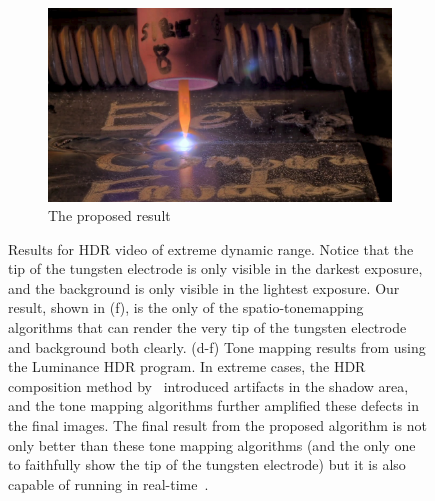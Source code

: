 \begin{figure}
\begin{subfigure}[b]{6.2in}
\centering
  \includegraphics[width=6.0in]{ch2/diagrams/frames/5stops/final_tm_result.jpg}
  \caption{The proposed result~\cite{lo2012high}}
  \label{fig:mouse}
\end{subfigure}
\caption{Results for HDR video of extreme dynamic range.
                 Notice that the tip of the tungsten electrode is only visible
                 in the darkest exposure, and the background is only visible
                 in the lightest exposure.
                 Our result, shown in (f), is the only of the spatio-tonemapping
                 algorithms that can render the very tip of the tungsten
                 electrode and background both clearly.
                 (d-f) Tone mapping results from 
\cite{mantiuk2006perceptual,fattal2002gradient,reinhard2002photographic} using the Luminance 
HDR program.
                 In extreme cases, the HDR composition method by~\cite{debevec2008recovering} 
introduced artifacts in the shadow area, and the tone mapping algorithms further amplified these 
defects in the final images.
                The final result from the proposed algorithm is not only better than these tone mapping algorithms (and the only one to 
faithfully show the tip of the tungsten electrode)
                but it is also capable of running in real-time~\cite{lo2012high}.}\label{fig:welding_results}
\end{figure}


